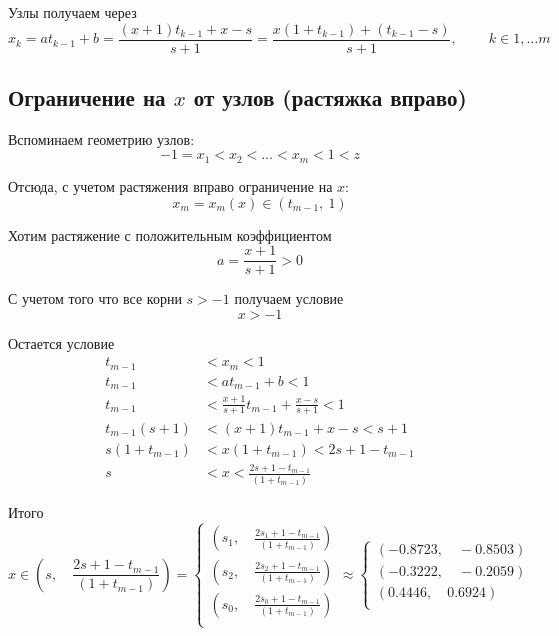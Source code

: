 \documentclass[12pt,a4paper]{article}
\begin{document}
	\noindent Узлы получаем через
	\[
	x_k = a t_{k-1} + b = \frac{(x+1)t_{k-1} + x-s}{s+1} =
	\frac{ x(1 + t_{k-1}) + (t_{k-1} - s) }{s+1} , \qquad \ k \in 1, \ldots m
	\]
	
	\subsection{Ограничение на $x$ от узлов (растяжка вправо)}
	
	\noindent Вспоминаем геометрию узлов:
	\[
	-1 = x_1 < x_2 < \ldots < x_m < 1 < z
	\]
	
	\noindent Отсюда, с учетом растяжения вправо ограничение на $x$:
	\[
	x_m = x_m(x) \in (t_{m-1}, \ 1)
	\]
	
	\noindent Хотим растяжение с положительным коэффициентом
	\[
	a =  \frac{x+1}{s+1} > 0
	\]
	
	\noindent С учетом того что все корни $s > -1$ получаем условие
	\[
	x > -1
	\]
	
	\noindent Остается условие
	\begin{align*}
	t_{m-1} &< x_m < 1 \\
	t_{m-1} &< a t_{m-1} + b < 1 \\
	t_{m-1} &< \frac{x+1}{s+1} t_{m-1} + \frac{x-s}{s+1} < 1 \\
	t_{m-1}(s+1) &< (x + 1) t_{m-1} + x - s < s + 1 \\
	s(1+t_{m-1}) &< x(1 + t_{m-1}) <  2s + 1 - t_{m-1} \\ 
	s &< x <  \frac{2s + 1 - t_{m-1}}{(1 + t_{m-1})} 
	\end{align*}
	
	\noindent Итого
	\[
	x \in \left( s, \quad \frac{2s + 1 - t_{m-1}}{(1 + t_{m-1})}   \right) = 
	\begin{cases}
		\left( s_1, \quad \frac{2s_1 + 1 - t_{m-1}}{(1 + t_{m-1})}   \right) \\
		\left( s_2, \quad \frac{2s_2 + 1 - t_{m-1}}{(1 + t_{m-1})}   \right) \\
		\left( s_0, \quad \frac{2s_0 + 1 - t_{m-1}}{(1 + t_{m-1})}   \right) \\
	\end{cases} \approx 
	\begin{cases}
		\left(-0.8723, \quad -0.8503 \right) \\
		\left(-0.3222, \quad -0.2059 \right) \\
		\left(0.4446, \quad 0.6924 \right) \\
	\end{cases}
	\]
	
\end{document}
